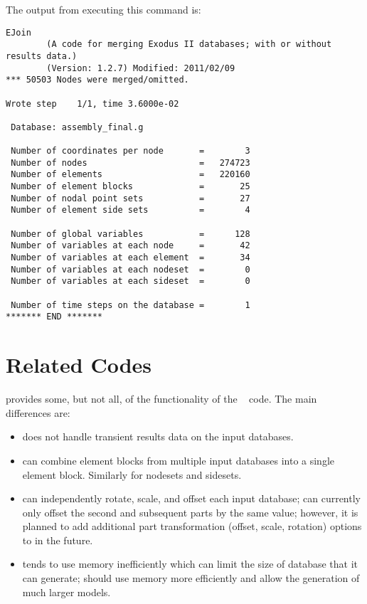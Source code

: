 The output from executing this command is:
\begin{verbatim}
EJoin
        (A code for merging Exodus II databases; with or without results data.)
        (Version: 1.2.7) Modified: 2011/02/09
*** 50503 Nodes were merged/omitted.

Wrote step    1/1, time 3.6000e-02

 Database: assembly_final.g

 Number of coordinates per node       =        3
 Number of nodes                      =   274723
 Number of elements                   =   220160
 Number of element blocks             =       25
 Number of nodal point sets           =       27
 Number of element side sets          =        4

 Number of global variables           =      128
 Number of variables at each node     =       42
 Number of variables at each element  =       34
 Number of variables at each nodeset  =        0
 Number of variables at each sideset  =        0

 Number of time steps on the database =        1
******* END *******
\end{verbatim}

\section{Related Codes}
\ejoin{} provides some, but not all, of the functionality of the
~\cite{bib:gjoin} code. The main differences are:
\begin{itemize}
\item {} does not handle transient results data on the input
databases.
\item {} can combine element blocks from multiple input
databases into a single element block. Similarly for nodesets and
sidesets.
\item {} can independently rotate, scale, and offset each
input database; \ejoin{} can currently only offset the second and
subsequent parts by the same value; however, it is planned to add
additional part transformation (offset, scale, rotation) options to
\ejoin{} in the future.

\item {} tends to use memory inefficiently which can limit
the size of database that it can generate; \ejoin{} should use memory
more efficiently and allow the generation of much larger models.
\end{itemize}
